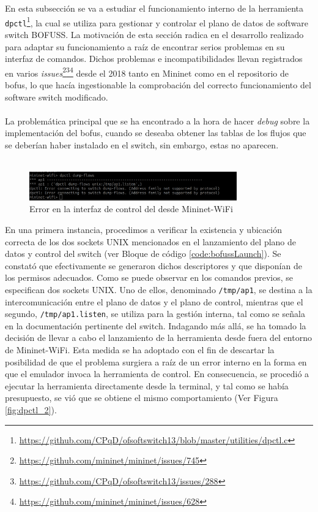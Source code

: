 En esta subsección se va a estudiar el funcionamiento interno de la herramienta \texttt{dpctl}\footnote{\url{https://github.com/CPqD/ofsoftswitch13/blob/master/utilities/dpctl.c}}, la cual se utiliza para gestionar y controlar el plano de datos de software switch BOFUSS. La motivación de esta sección radica en el desarrollo realizado para adaptar su funcionamiento a raíz de encontrar serios problemas en su interfaz de comandos. Dichos problemas e incompatibilidades llevan registrados en varios \textit{issues}\footnote{\url{https://github.com/mininet/mininet/issues/745}}\footnote{\url{https://github.com/CPqD/ofsoftswitch13/issues/288}}\footnote{\url{https://github.com/mininet/mininet/issues/628}} desde el 2018 tanto en Mininet como en el repositorio de \gls{bofus}, lo que hacía ingestionable la comprobación del correcto funcionamiento del software switch modificado.\\
\\
La problemática principal que se ha encontrado a la hora de hacer \textit{debug} sobre la implementación del \gls{bofus}, cuando se deseaba obtener las tablas de los flujos que se deberían haber instalado en el switch, sin embargo, estas no aparecen.\\
\\

\begin{figure}[ht]
    \centering
    \includegraphics[width=0.8\textwidth]{archivos/img/dev/dpctl_1.png}
    \caption{Error en la interfaz de control del  desde Mininet-WiFi}
    \label{fig:dpctl_1}
\end{figure}

En una primera instancia, procedimos a verificar la existencia y ubicación correcta de los dos sockets UNIX mencionados en el lanzamiento del plano de datos y control del switch (ver Bloque de código \ref{code:bofussLaunch}). Se constató que efectivamente se generaron dichos descriptores y que disponían de los permisos adecuados. Como se puede observar en los comandos previos, se especifican dos sockets UNIX. Uno de ellos, denominado \texttt{/tmp/ap1}, se destina a la intercomunicación entre el plano de datos y el plano de control, mientras que el segundo, \texttt{/tmp/ap1.listen}, se utiliza para la gestión interna, tal como se señala en la documentación pertinente del switch. Indagando más allá, se ha tomado la decisión de llevar a cabo el lanzamiento de la herramienta desde fuera del entorno de Mininet-WiFi. Esta medida se ha adoptado con el fin de descartar la posibilidad de que el problema surgiera a raíz de un error interno en la forma en que el emulador invoca la herramienta de control. En consecuencia, se procedió a ejecutar la herramienta directamente desde la terminal, y tal como se había presupuesto, se vió que se obtiene el mismo comportamiento (Ver Figura \ref{fig:dpctl_2}).\\

